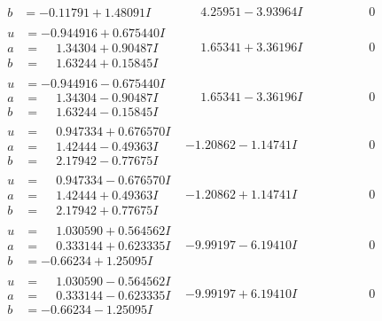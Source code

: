 \documentclass[1p]{elsarticle_modified}
\theoremstyle{definition}
\begin{document}
$$\begin{array}{c|c|c}
\begin{aligned}
b &= -0.11791 + 1.48091 I\end{aligned}
 & \phantom{-}4.25951 - 3.93964 I & \phantom{-0.000000 } 0 \\ \hline\begin{aligned}
u &= -0.944916 + 0.675440 I \\
a &= \phantom{-}1.34304 + 0.90487 I \\
b &= \phantom{-}1.63244 + 0.15845 I\end{aligned}
 & \phantom{-}1.65341 + 3.36196 I & \phantom{-0.000000 } 0 \\ \hline\begin{aligned}
u &= -0.944916 - 0.675440 I \\
a &= \phantom{-}1.34304 - 0.90487 I \\
b &= \phantom{-}1.63244 - 0.15845 I\end{aligned}
 & \phantom{-}1.65341 - 3.36196 I & \phantom{-0.000000 } 0 \\ \hline\begin{aligned}
u &= \phantom{-}0.947334 + 0.676570 I \\
a &= \phantom{-}1.42444 - 0.49363 I \\
b &= \phantom{-}2.17942 - 0.77675 I\end{aligned}
 & -1.20862 - 1.14741 I & \phantom{-0.000000 } 0 \\ \hline\begin{aligned}
u &= \phantom{-}0.947334 - 0.676570 I \\
a &= \phantom{-}1.42444 + 0.49363 I \\
b &= \phantom{-}2.17942 + 0.77675 I\end{aligned}
 & -1.20862 + 1.14741 I & \phantom{-0.000000 } 0 \\ \hline\begin{aligned}
u &= \phantom{-}1.030590 + 0.564562 I \\
a &= \phantom{-}0.333144 + 0.623335 I \\
b &= -0.66234 + 1.25095 I\end{aligned}
 & -9.99197 - 6.19410 I & \phantom{-0.000000 } 0 \\ \hline\begin{aligned}
u &= \phantom{-}1.030590 - 0.564562 I \\
a &= \phantom{-}0.333144 - 0.623335 I \\
b &= -0.66234 - 1.25095 I\end{aligned}
 & -9.99197 + 6.19410 I & \phantom{-0.000000 } 0 \\ \hline\begin{aligned}

\end{aligned}
\end{array}$$
\end{document}
